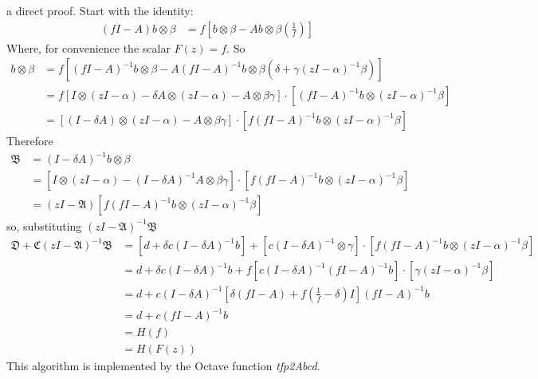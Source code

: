 \documentclass[a4paper,twoside,10pt,english]{report}
\begin{document}
a direct proof. Start with the identity:
\begin{align*}
\left(fI-A\right)b\otimes\beta &= f\left[b\otimes\beta-Ab\otimes\beta\left(\frac{1}{f}\right)\right]
\end{align*}
Where, for convenience the scalar $F\left(z\right)=f$. So 
\begin{align*}
b\otimes\beta &= f\left[\left(fI-A\right)^{-1}b\otimes\beta-A\left(fI-A\right)^{-1}b\otimes\beta\left(\delta+\gamma\left(zI-\alpha\right)^{-1}\beta\right)\right]\\
 &= f\left[I\otimes\left(zI-\alpha\right)-\delta A\otimes\left(zI-\alpha\right)-A\otimes\beta\gamma\right]\cdot\left[\left(fI-A\right)^{-1}b\otimes\left(zI-\alpha\right)^{-1}\beta\right]\\
 &=  \left[\left(I-\delta A\right)\otimes\left(zI-\alpha\right)-A\otimes\beta\gamma\right]\cdot\left[f\left(fI-A\right)^{-1}b\otimes\left(zI-\alpha\right)^{-1}\beta\right]
\end{align*}
Therefore
\begin{align*}
\mathfrak{B} &= \left(I-\delta A\right)^{-1}b\otimes\beta\\
 &= \left[I\otimes\left(zI-\alpha\right)-\left(I-\delta A\right)^{-1}A\otimes\beta\gamma\right]\cdot\left[f\left(fI-A\right)^{-1}b\otimes\left(zI-\alpha\right)^{-1}\beta\right]\\
 &= \left(zI-\mathfrak{A}\right)\left[f\left(fI-A\right)^{-1}b\otimes\left(zI-\alpha\right)^{-1}\beta\right]
\end{align*}
so, substituting $\left(zI-\mathfrak{A}\right)^{-1}\mathfrak{B}$
\begin{align*}
\mathfrak{D}+\mathfrak{C}\left(zI-\mathfrak{A}\right)^{-1}\mathfrak{B} 
&= \left[ d+\delta c\left(I-\delta A\right)^{-1}b\right] 
 +
   \left[c\left(I-\delta A\right)^{-1}\otimes\gamma\right]
   \cdot
   \left[f\left(fI-A\right)^{-1}b\otimes\left(zI-\alpha\right)^{-1}\beta\right]\\
 &= d+\delta c\left(I-\delta A\right)^{-1}b
    + f\left[c\left(I-\delta A\right)^{-1}\left(fI-A\right)^{-1}b \right]
      \cdot
      \left[ \gamma\left(zI-\alpha\right)^{-1}\beta \right] \\
 &= d+c\left(I-\delta A\right)^{-1}
      \left[ \delta\left(fI-A\right)+f\left(\frac{1}{f}-\delta\right)I\right]
      \left(fI-A\right)^{-1}b\\
 &= d+c\left(fI-A\right)^{-1}b\\
 &= H\left(f\right)\\
 &= H\left(F\left(z\right)\right)
\end{align*}
This algorithm is implemented by the Octave function \emph{tfp2Abcd}.
\end{document}
